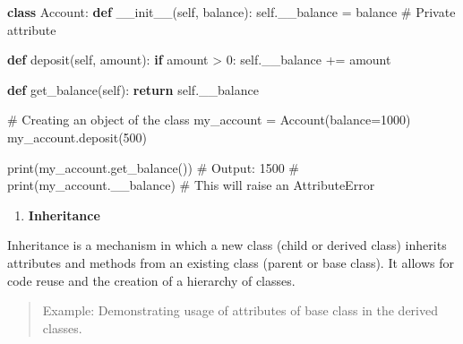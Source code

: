 \documentclass[
  letterpaper,
  DIV=11,
  numbers=noendperiod]{scrreprt}
\newenvironment{Shaded}{\begin{snugshade}}{\end{snugshade}}
\newcommand{\BuiltInTok}[1]{\textcolor[rgb]{0.00,0.23,0.31}{#1}}
\newcommand{\CommentTok}[1]{\textcolor[rgb]{0.37,0.37,0.37}{#1}}
\newcommand{\ControlFlowTok}[1]{\textcolor[rgb]{0.00,0.23,0.31}{\textbf{#1}}}
\newcommand{\DecValTok}[1]{\textcolor[rgb]{0.68,0.00,0.00}{#1}}
\newcommand{\FunctionTok}[1]{\textcolor[rgb]{0.28,0.35,0.67}{#1}}
\newcommand{\KeywordTok}[1]{\textcolor[rgb]{0.00,0.23,0.31}{\textbf{#1}}}
\newcommand{\NormalTok}[1]{\textcolor[rgb]{0.00,0.23,0.31}{#1}}
\newcommand{\OperatorTok}[1]{\textcolor[rgb]{0.37,0.37,0.37}{#1}}
\newcommand{\VariableTok}[1]{\textcolor[rgb]{0.07,0.07,0.07}{#1}}
\providecommand{\tightlist}{%
  \setlength{\itemsep}{0pt}\setlength{\parskip}{0pt}}\usepackage{longtable,booktabs,array}
\theoremstyle{plain}
\theoremstyle{definition}
\theoremstyle{remark}
\begin{document}
\begin{Shaded}
\begin{Highlighting}[]
\KeywordTok{class}\NormalTok{ Account:}
    \KeywordTok{def} \FunctionTok{\_\_init\_\_}\NormalTok{(}\VariableTok{self}\NormalTok{, balance):}
        \VariableTok{self}\NormalTok{.\_\_balance }\OperatorTok{=}\NormalTok{ balance  }\CommentTok{\# Private attribute}
    
    \KeywordTok{def}\NormalTok{ deposit(}\VariableTok{self}\NormalTok{, amount):}
        \ControlFlowTok{if}\NormalTok{ amount }\OperatorTok{\textgreater{}} \DecValTok{0}\NormalTok{:}
            \VariableTok{self}\NormalTok{.\_\_balance }\OperatorTok{+=}\NormalTok{ amount}
    
    \KeywordTok{def}\NormalTok{ get\_balance(}\VariableTok{self}\NormalTok{):}
        \ControlFlowTok{return} \VariableTok{self}\NormalTok{.\_\_balance}

\CommentTok{\# Creating an object of the class}
\NormalTok{my\_account }\OperatorTok{=}\NormalTok{ Account(balance}\OperatorTok{=}\DecValTok{1000}\NormalTok{)}
\NormalTok{my\_account.deposit(}\DecValTok{500}\NormalTok{)}

\BuiltInTok{print}\NormalTok{(my\_account.get\_balance())  }\CommentTok{\# Output: 1500}
\CommentTok{\# print(my\_account.\_\_balance)  \# This will raise an AttributeError}
\end{Highlighting}
\end{Shaded}

\begin{enumerate}
\def\labelenumi{\arabic{enumi}.}
\setcounter{enumi}{2}
\tightlist
\item
  \textbf{Inheritance}
\end{enumerate}

Inheritance is a mechanism in which a new class (child or derived class)
inherits attributes and methods from an existing class (parent or base
class). It allows for code reuse and the creation of a hierarchy of
classes.

\begin{quote}
Example: Demonstrating usage of attributes of base class in the derived
classes.
\end{quote}
\end{document}
